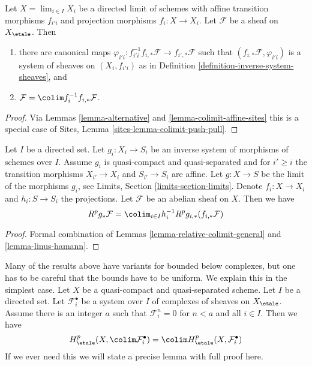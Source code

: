 \begin{lemma}
\label{lemma-linus-hamann}
Let $X = \lim_{i \in I} X_i$ be a directed limit of schemes
with affine transition morphisms $f_{i'i}$ and projection morphisms
$f_i : X \to X_i$. Let $\mathcal{F}$ be a sheaf on $X_\etale$. Then
\begin{enumerate}
\item there are canonical maps
$\varphi_{i'i} : f_{i'i}^{-1}f_{i, *}\mathcal{F} \to f_{i', *}\mathcal{F}$
such that $(f_{i, *}\mathcal{F}, \varphi_{i'i})$ is a system of
sheaves on $(X_i, f_{i'i})$ as in
Definition \ref{definition-inverse-system-sheaves}, and
\item $\mathcal{F} = \colim f_i^{-1}f_{i, *}\mathcal{F}$.
\end{enumerate}
\end{lemma}

\begin{proof}
Via Lemmas \ref{lemma-alternative} and \ref{lemma-colimit-affine-sites}
this is a special case of
Sites, Lemma \ref{sites-lemma-colimit-push-pull}.
\end{proof}

\begin{lemma}
\label{lemma-compute-strangely}
Let $I$ be a directed set. Let $g_i : X_i \to S_i$ be an inverse system of
morphisms of schemes over $I$. Assume $g_i$ is quasi-compact and
quasi-separated and for $i' \geq i$ the transition morphisms
$X_{i'} \to X_i$ and $S_{i'} \to S_i$ are affine.
Let $g : X \to S$ be the limit of the morphisms $g_i$, see
Limits, Section \ref{limits-section-limits}.
Denote $f_i : X \to X_i$ and $h_i : S \to S_i$ the projections.
Let $\mathcal{F}$ be an  abelian sheaf on $X$. Then we have
$$
R^pg_*\mathcal{F} = \colim_{i \in I} h_i^{-1}R^pg_{i, *}(f_{i, *}\mathcal{F})
$$
\end{lemma}

\begin{proof}
Formal combination of Lemmas \ref{lemma-relative-colimit-general}
and \ref{lemma-linus-hamann}.
\end{proof}

\begin{remark}
\label{remark-colimit-variant-complexes}
Many of the results above have variants for bounded below
complexes, but one has to be careful that the bounds have
to be uniform. We explain this in the simplest case.
Let $X$ be a quasi-compact and quasi-separated scheme.
Let $I$ be a directed set. Let $\mathcal{F}_i^\bullet$ be a
system over $I$ of complexes of sheaves on $X_\etale$.
Assume there is an integer $a$ such that
$\mathcal{F}_i^n = 0$ for $n < a$ and all $i \in I$.
Then we have
$$
H^p_\etale(X, \colim \mathcal{F}_i^\bullet) =
\colim H^p_\etale(X, \mathcal{F}^\bullet_i)
$$
If we ever need this we will state a precise lemma with
full proof here.
\end{remark}





